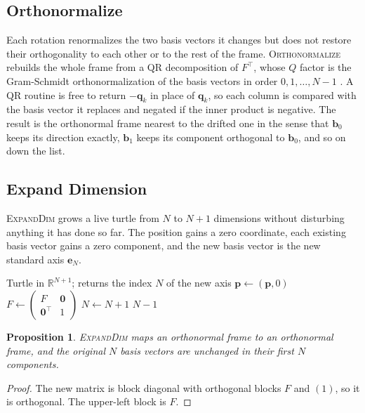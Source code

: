 \documentclass[11pt,letterpaper]{article}
\newtheorem{proposition}{Proposition}[section]
\newcommand{\R}{\mathbb{R}}
\newcommand{\pos}{\mathbf{p}}
\newcommand{\basis}{\mathbf{b}}
\newcommand{\std}{\mathbf{e}}
\newcommand{\op}[1]{\textup{\textsc{#1}}}
\begin{document}
\subsection{Orthonormalize}

Each rotation renormalizes the two basis vectors it changes but does
not restore their orthogonality to each other or to the rest of the
frame. \op{Orthonormalize} rebuilds the whole frame from a QR
decomposition of $F^\top$, whose $Q$ factor is the Gram-Schmidt
orthonormalization of the basis vectors in order $0, 1, \ldots, N-1$
\citep{golub2013matrix}. A QR routine is free to return $-\mathbf{q}_k$
in place of $\mathbf{q}_k$, so each column is compared with the basis
vector it replaces and negated if the inner product is negative. The
result is the orthonormal frame nearest to the drifted one in the sense
that $\basis_0$ keeps its direction exactly, $\basis_1$ keeps its
component orthogonal to $\basis_0$, and so on down the list.

\subsection{Expand Dimension}
\label{sec:expand}

\op{ExpandDim} grows a live turtle from $N$ to $N + 1$ dimensions
without disturbing anything it has done so far. The position gains a
zero coordinate, each existing basis vector gains a zero component, and
the new basis vector is the new standard axis $\std_N$.

\begin{algorithm}[H]
\caption{\op{ExpandDim}$()$}
\label{alg:expand}
\begin{algorithmic}[1]
\Ensure Turtle in $\R^{N+1}$; returns the index $N$ of the new axis
\State $\pos \leftarrow (\pos, 0)$
\State $F \leftarrow \begin{pmatrix} F & \mathbf{0} \\ \mathbf{0}^\top & 1 \end{pmatrix}$
\State $N \leftarrow N + 1$
\State \Return $N - 1$
\end{algorithmic}
\end{algorithm}

\begin{proposition}
\label{prop:expand}
\op{ExpandDim} maps an orthonormal frame to an orthonormal frame,
and the original $N$ basis vectors are unchanged in their first $N$
components.
\end{proposition}

\begin{proof}
The new matrix is block diagonal with orthogonal blocks $F$ and $(1)$,
so it is orthogonal. The upper-left block is $F$.
\end{proof}
\end{document}
